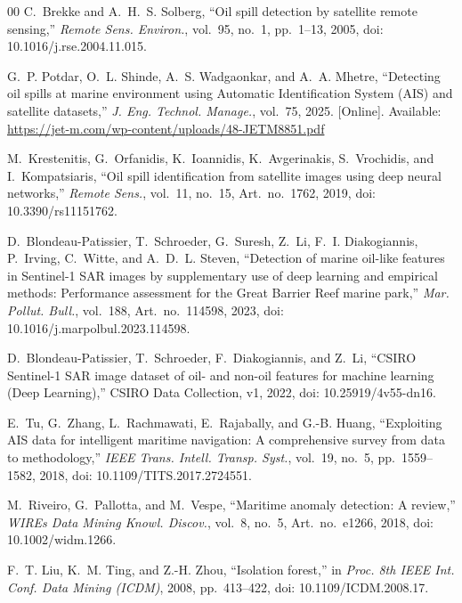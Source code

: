 \documentclass[conference]{IEEEtran}
\begin{document}
\begin{thebibliography}{00}
 C.~Brekke and A.~H.~S. Solberg, ``Oil spill detection by satellite
remote sensing,'' \emph{Remote Sens. Environ.}, vol.~95, no.~1, pp.~1--13, 2005,
doi: 10.1016/j.rse.2004.11.015.

 G.~P. Potdar, O.~L. Shinde, A.~S. Wadgaonkar, and A.~A. Mhetre,
``Detecting oil spills at marine environment using Automatic Identification System (AIS)
and satellite datasets,'' \emph{J. Eng. Technol. Manage.}, vol.~75, 2025. [Online].
Available: \url{https://jet-m.com/wp-content/uploads/48-JETM8851.pdf}

 M.~Krestenitis, G.~Orfanidis, K.~Ioannidis, K.~Avgerinakis,
S.~Vrochidis, and I.~Kompatsiaris, ``Oil spill identification from satellite images using
deep neural networks,'' \emph{Remote Sens.}, vol.~11, no.~15, Art.~no.~1762, 2019,
doi: 10.3390/rs11151762.

 D.~Blondeau-Patissier, T.~Schroeder, G.~Suresh, Z.~Li,
F.~I. Diakogiannis, P.~Irving, C.~Witte, and A.~D.~L. Steven, ``Detection of marine
oil-like features in Sentinel-1 SAR images by supplementary use of deep learning and
empirical methods: Performance assessment for the Great Barrier Reef marine park,''
\emph{Mar. Pollut. Bull.}, vol.~188, Art.~no.~114598, 2023,
doi: 10.1016/j.marpolbul.2023.114598.

 D.~Blondeau-Patissier, T.~Schroeder, F.~Diakogiannis, and Z.~Li,
``CSIRO Sentinel-1 SAR image dataset of oil- and non-oil features for machine learning
(Deep Learning),'' CSIRO Data Collection, v1, 2022, doi: 10.25919/4v55-dn16.

 E.~Tu, G.~Zhang, L.~Rachmawati, E.~Rajabally, and G.-B. Huang,
``Exploiting AIS data for intelligent maritime navigation: A comprehensive survey from
data to methodology,'' \emph{IEEE Trans. Intell. Transp. Syst.}, vol.~19, no.~5,
pp.~1559--1582, 2018, doi: 10.1109/TITS.2017.2724551.

 M.~Riveiro, G.~Pallotta, and M.~Vespe, ``Maritime anomaly
detection: A review,'' \emph{WIREs Data Mining Knowl. Discov.}, vol.~8, no.~5,
Art.~no.~e1266, 2018, doi: 10.1002/widm.1266.

 F.~T. Liu, K.~M. Ting, and Z.-H. Zhou, ``Isolation forest,'' in
\emph{Proc. 8th IEEE Int. Conf. Data Mining (ICDM)}, 2008, pp.~413--422,
doi: 10.1109/ICDM.2008.17.


\end{thebibliography}
\end{document}
